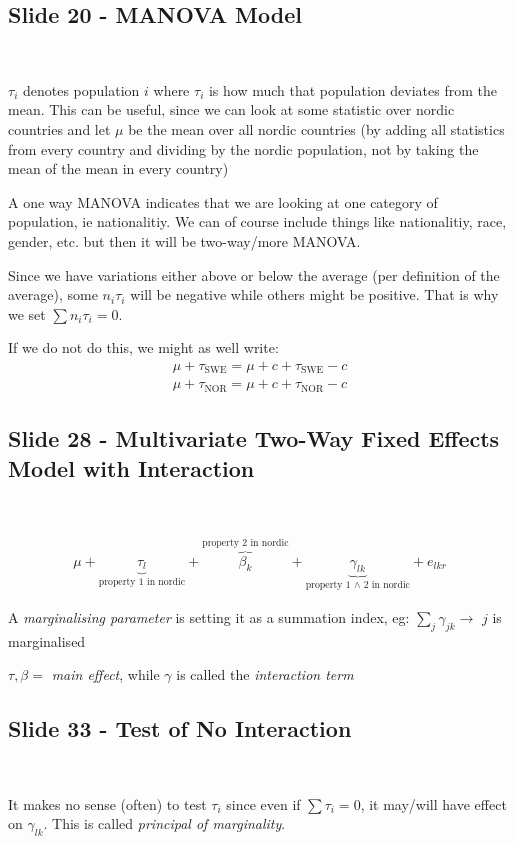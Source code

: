 \subsection{Slide 20 - MANOVA Model}\hfill\\
\par\bigskip
\noindent $\tau_i$ denotes population $i$ where $\tau_i$ is how much that population deviates from the mean. This can be useful, since we can look at some statistic over nordic countries and let $\mu$ be the mean over all nordic countries (by adding all statistics from every country and dividing by the nordic population, not by taking the mean of the mean in every country)
\par\bigskip
\noindent A one way MANOVA indicates that we are looking at one category of population, ie nationalitiy. We can of course include things like nationalitiy, race, gender, etc. but then it will be two-way/more MANOVA.
\par\bigskip
\noindent Since we have variations either above or below the average (per definition of the average), some $n_i\tau_i$ will be negative while others might be positive. That is why we set $\sum n_i\tau_i =0$.\par
\noindent If we do not do this, we might as well write:
\begin{equation*}
  \begin{gathered}
    \mu+\tau_{\text{SWE}} = \mu+c+\tau_{\text{SWE}}-c\\
    \mu+\tau_{\text{NOR}} = \mu+c+\tau_{\text{NOR}}-c
  \end{gathered}
\end{equation*}
\par\bigskip
\subsection{Slide 28 -  Multivariate Two-Way Fixed Effects Model with Interaction}\hfill\\\par
\begin{equation*}
  \begin{gathered}
    \mu+\underbrace{\tau_{l}}_{\text{property 1 in nordic}}+\overbrace{\beta_k}^{\text{property 2 in nordic}}+\underbrace{\gamma_{lk}}_{\text{property 1 $\wedge$ 2 in nordic}}+e_{lkr}
  \end{gathered}
\end{equation*}
\par\bigskip
\noindent A \textit{marginalising parameter} is setting it as a summation index, eg: $\sum_j \gamma_{jk}\rightarrow$ $j$ is marginalised
\par\bigskip
\noindent $\tau,\beta = $ \textit{main effect}, while $\gamma$ is called the \textit{interaction term}
\par\bigskip
\subsection{Slide 33 - Test of No Interaction}\hfill\\
\par\bigskip
\noindent It makes no sense (often) to test $\tau_i$ since even if $\sum\tau_i=0$, it may/will have effect on $\gamma_{lk}$. This is called \textit{principal of marginality}.

